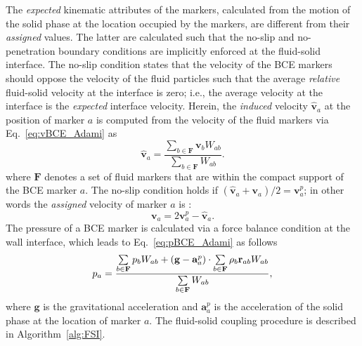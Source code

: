 The \textit{expected} kinematic attributes of the markers, calculated from the motion of the solid phase at the location occupied by the markers, are different from their \textit{assigned} values. The latter are calculated such that the no-slip and no-penetration boundary conditions are implicitly enforced at the fluid-solid interface. The no-slip condition states that the velocity of the BCE markers should oppose the velocity of the fluid particles such that the average \textit{relative} fluid-solid velocity at the interface is zero; i.e., the average velocity at the interface is the \textit{expected} interface velocity. Herein, the \textit{induced} velocity $\hat{\mathbf{v}}_a$ at the position of marker $a$ is computed from the velocity of the fluid markers via Eq.~\ref{eq:vBCE_Adami} as
\begin{equation*} 
\hat{\mathbf{v}}_a = \frac{\sum\limits_{b \in \mathbf{F}} {\mathbf{v}_b W_{ab}}}{\sum\limits_{b \in \mathbf{F}} {W_{ab}}}.
\end{equation*}
where $\mathbf{F}$ denotes a set of fluid markers that are within the compact support of the BCE marker $a$.  The no-slip condition holds if $({\hat{\mathbf{v}}_a+\mathbf{v}_a})/2=\mathbf{v}_a^p$; in other words the \textit{assigned} velocity of marker $a$ is \cite{Adami2012}:
\begin{equation} \label{eq:no_slip}
\mathbf{v}_a = 2 \mathbf{v}^{p}_a - {\hat{\mathbf{v}}}_a.
\end{equation}
The pressure of a BCE marker is calculated via a force balance condition at the wall interface, which leads to Eq.~\ref{eq:pBCE_Adami} as follows \cite{Adami2012}
\begin{equation*}
p_a = \frac{\sum\limits_{b \in \bf F} {p_b W_{ab}} + \left( \mathbf{g} - \mathbf{a}_a^p \right) \cdot \sum\limits_{b \in \bf F} {\rho_b \mathbf{r}_{ab} W_{ab} }}{\sum\limits_{b \in \bf F} {W_{ab}}},
\end{equation*}
where $\mathbf{g}$ is the gravitational acceleration and $\mathbf{a}_a^p$ is the acceleration of the solid phase at the location of  marker $a$. The fluid-solid coupling procedure is described in Algorithm~\ref{alg:FSI}.

